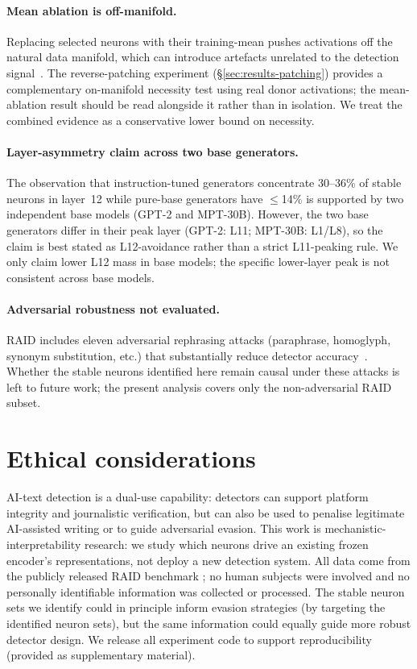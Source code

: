 \documentclass[11pt]{article}
\begin{document}
\paragraph{Mean ablation is off-manifold.}
Replacing selected neurons with their training-mean pushes activations off the natural data manifold, which can introduce artefacts unrelated to the detection signal~\citep{heimersheim2024patching}. The reverse-patching experiment (§\ref{sec:results-patching}) provides a complementary on-manifold necessity test using real donor activations; the mean-ablation result should be read alongside it rather than in isolation. We treat the combined evidence as a conservative lower bound on necessity.

\paragraph{Layer-asymmetry claim across two base generators.}
The observation that instruction-tuned generators concentrate 30--36\% of stable neurons in layer~12 while pure-base generators have $\leq$14\% is supported by two independent base models (GPT-2 and MPT-30B). However, the two base generators differ in their peak layer (GPT-2: L11; MPT-30B: L1/L8), so the claim is best stated as L12-avoidance rather than a strict L11-peaking rule. We only claim lower L12 mass in base models; the specific lower-layer peak is not consistent across base models.

\paragraph{Adversarial robustness not evaluated.}
RAID includes eleven adversarial rephrasing attacks (paraphrase, homoglyph, synonym substitution, etc.) that substantially reduce detector accuracy~\citep{dugan2024raid}. Whether the stable neurons identified here remain causal under these attacks is left to future work; the present analysis covers only the non-adversarial RAID subset.

\section*{Ethical considerations}
\label{sec:ethics}

AI-text detection is a dual-use capability: detectors can support platform integrity and journalistic verification, but can also be used to penalise legitimate AI-assisted writing or to guide adversarial evasion. This work is mechanistic-interpretability research: we study which neurons drive an existing frozen encoder's representations, not deploy a new detection system. All data come from the publicly released RAID benchmark \citep{dugan2024raid}; no human subjects were involved and no personally identifiable information was collected or processed. The stable neuron sets we identify could in principle inform evasion strategies (by targeting the identified neuron sets), but the same information could equally guide more robust detector design. We release all experiment code to support reproducibility (provided as supplementary material).
\end{document}
